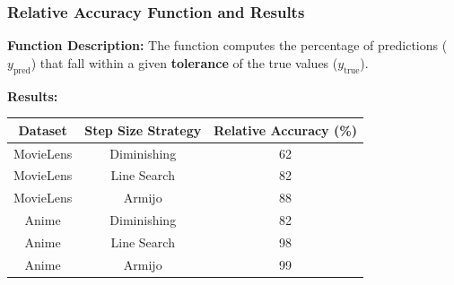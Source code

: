 \documentclass[12pt]{beamer}
\begin{document}
\begin{frame}
    \frametitle{\textbf{Relative Accuracy Function and Results}}
     \vspace{-0.7cm}
    \textbf{Function Description:}
 The function computes the percentage of predictions (\( y_{\text{pred}} \)) that fall within a given \textbf{tolerance} of the true values (\( y_{\text{true}} \)).
 
     \vspace{0.3cm}
    \textbf{Results:}
    \begin{table}[H]
        \centering
        \begin{tabular}{|c|c|c|}
            \hline
            \textbf{Dataset} & \textbf{Step Size Strategy} & \textbf{Relative Accuracy (\%)} \\ \hline
            MovieLens & Diminishing & 62 \\ \hline
            MovieLens & Line Search & 82 \\ \hline
            MovieLens & Armijo & 88 \\ \hline
            Anime & Diminishing & 82 \\ \hline
            Anime & Line Search & 98 \\ \hline
            Anime & Armijo & 99 \\ \hline
        \end{tabular}
    \end{table}
\end{frame}
\end{document}
